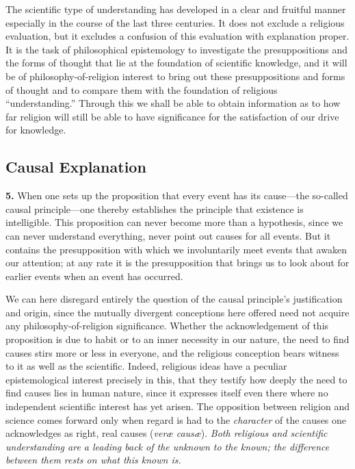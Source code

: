 \documentclass[12pt,a4paper]{book}
\newcommand{\opage}[1]{\marginnote{\footnotesize\textit{[#1]}}}
\begin{document}
The scientific type of understanding has developed in a clear and
fruitful manner especially in the course of the last three centuries. It
does not exclude a religious evaluation, but it excludes a confusion of
this evaluation with explanation proper. It is the task of philosophical
epistemology to investigate the presuppositions and the forms of thought
that lie at the foundation of scientific knowledge, and it will be of
philosophy-of-religion interest to bring out these presuppositions and
forms of thought and to compare them with the foundation of religious
``understanding.'' Through this we shall be able to obtain information
as to how far religion will still be able to have significance for the
satisfaction of our drive for knowledge.

\subsection{Causal Explanation}
\label{ssec:causal}

\noindent\textbf{5.} When one sets up the proposition that every event
has its cause---the so-called causal principle---one thereby establishes
the principle that existence is intelligible. This proposition can never
become more than a hypothesis, since we can never understand everything,
never point out causes for all events. But it 
\opage{18}contains the
presupposition with which we involuntarily meet events that awaken our
attention; at any rate it is the presupposition that brings us to look
about for earlier events when an event has occurred.

We can here disregard entirely the question of the causal principle's
justification and origin, since the mutually divergent conceptions here
offered need not acquire any philosophy-of-religion significance.
Whether the acknowledgement of this proposition is due to habit or to an
inner necessity in our nature, the need to find causes stirs more or
less in everyone, and the religious conception bears witness to it as
well as the scientific. Indeed, religious ideas have a peculiar
epistemological interest precisely in this, that they testify how deeply
the need to find causes lies in human nature, since it expresses itself
even there where no independent scientific interest has yet arisen. The
opposition between religion and science comes forward only when regard
is had to the \emph{character} of the causes one acknowledges as right,
real causes (\textit{veræ causæ}). \emph{Both religious and scientific
understanding are a leading back of the unknown to the known; the
difference between them rests on what this known is.}
\end{document}
